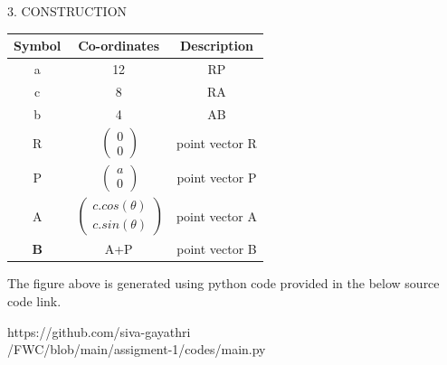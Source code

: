 \documentclass[a4paper,10pt]{report}
\begin{document}
\begin{multicols}{2}
\centering \large\textsc{3.  C}\footnotesize\textsc{ONSTRUCTION}\vspace{5mm}\\
\begin{center}
    \label{tab:truthtable}
    \setlength{\arrayrulewidth}{0.2mm}
\setlength{\tabcolsep}{5pt}
\renewcommand{\arraystretch}{2}
    \begin{tabular}{|c|c|c|}
    \hline %
      \large\textbf{Symbol} & \large\textbf{Co-ordinates} & \large\textbf{Description}\\
      \hline
	\large a & 12 & \large RP\\
	\large c & 8 & \large RA\\
	\large b & 4 & \large AB\\
	\large R &  $\ \begin{pmatrix} 0\\0 \end{pmatrix}$  & \large point vector R\\
	\large P &  $\ \begin{pmatrix} a\\0 \end{pmatrix}$ & \large point vector P\\
	\large A &  $\ \begin{pmatrix} c.cos(\theta) \\ c. sin(\theta) \end{pmatrix}$ & \large point vector A\\ 
		\large\textbf B & {A+P}  & \large point vector B\\ 
      \hline 
   \end{tabular}
 \end{center}\vspace{10mm} 


\raggedright\large{The figure above is generated using python code provided in the below source code link.}\vspace{2mm}\\
\begin{mdframed}
\raggedright\large{https://github.com/siva-gayathri \\ /FWC/blob/main/assigment-1/codes/main.py}
\end{mdframed}


\end{multicols}
\end{document}
